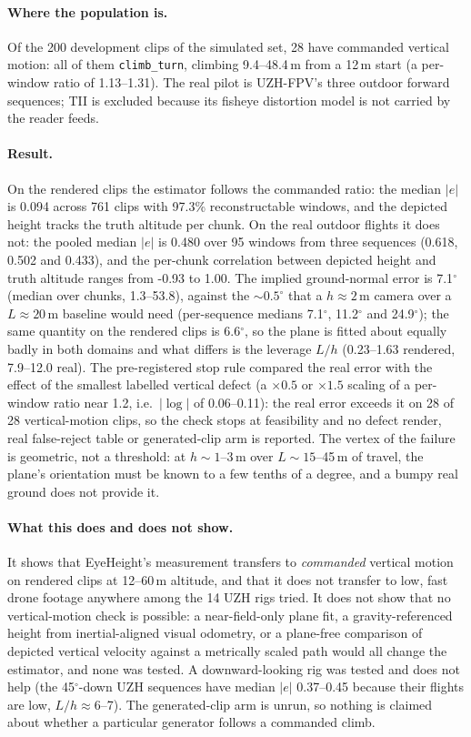 \paragraph{Where the population is.}
Of the 200 development clips of the simulated set, 28 have commanded vertical motion: all of
them \texttt{climb\_turn}, climbing 9.4--48.4\,m from a 12\,m start (a per-window ratio of
1.13--1.31). The real pilot is UZH-FPV's three outdoor forward sequences; TII is excluded
because its fisheye distortion model is not carried by the reader feeds.

\paragraph{Result.}
On the rendered clips the estimator follows the commanded ratio: the median $|e|$ is
0.094 across 761 clips with 97.3\% reconstructable windows, and the
depicted height tracks the truth altitude per chunk. On the real outdoor flights it does not:
the pooled median $|e|$ is 0.480 over 95 windows from three sequences
(0.618, 0.502 and 0.433), and the per-chunk correlation between depicted height and truth altitude
ranges from -0.93 to 1.00. The implied ground-normal error is
7.1$^\circ$ (median over chunks, 1.3--53.8), against the
$\sim0.5^\circ$ that a $h \approx 2$\,m camera over a $L \approx 20$\,m baseline would need
(per-sequence medians 7.1$^\circ$, 11.2$^\circ$ and 24.9$^\circ$); the same quantity on the
rendered clips is 6.6$^\circ$, so the plane is fitted about equally badly in both domains and what
differs is the leverage $L/h$ (0.23--1.63 rendered, 7.9--12.0 real).
The pre-registered stop rule compared the real error with the effect of the smallest labelled
vertical defect (a $\times 0.5$ or $\times 1.5$ scaling of a per-window ratio near 1.2, i.e.\
$|\log|$ of 0.06--0.11): the real error exceeds it on 28 of 28 vertical-motion clips, so
the check stops at feasibility and no defect render, real false-reject table or generated-clip
arm is reported. The vertex of the failure is geometric, not a threshold: at
$h \sim 1$--3\,m over $L \sim 15$--45\,m of travel, the plane's orientation must be known to a
few tenths of a degree, and a bumpy real ground does not provide it.

\paragraph{What this does and does not show.}
It shows that EyeHeight's measurement transfers to \emph{commanded} vertical motion on rendered
clips at 12--60\,m altitude, and that it does not transfer to low, fast drone footage anywhere among the
14 UZH rigs tried. It does not show that no vertical-motion check is possible: a
near-field-only plane fit, a gravity-referenced height from inertial-aligned visual odometry, or
a plane-free comparison of depicted vertical velocity against a metrically scaled path would all
change the estimator, and none was tested. A downward-looking rig was tested and does not help
(the 45$^\circ$-down UZH sequences have median $|e|$ 0.37--0.45 because their flights are low,
$L/h \approx 6$--7). The
generated-clip arm is unrun, so nothing is claimed about whether a particular generator follows
a commanded climb.

